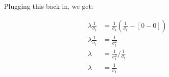 \documentclass{hw}
\begin{document}
    Plugging this back in, we get:

    \begin{align*}
        \lambda \frac{1}{\sigma_t} &= \frac{1}{\sigma_t} \left( \frac{1}{\sigma_t} - \left[ 0 - 0 \right] \right) \\
        \lambda \frac{1}{\sigma_t} &= \frac{1}{\sigma_t^2} \\
        \lambda &= {\frac{1}{\sigma_t^2}} / {\frac{1}{\sigma_t}} \\
        \lambda &= \frac{1}{\sigma_t}
    \end{align*}
\end{document}
